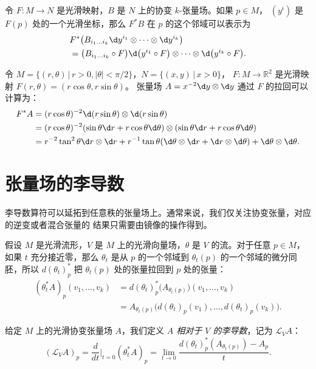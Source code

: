 \begin{corollary}
  令 $F:M\to N$ 是光滑映射，$B$ 是 $N$ 上的协变 $k$-张量场。如果 $p\in M$，
  $(y^i)$ 是 $F(p)$ 处的一个光滑坐标，那么 $F^*B$ 在 $p$ 的这个邻域可以表示为
  \begin{align*}
    &F^*\bigl(B_{i_1\dots i_k}\d y^{i_1}\otimes\cdots\otimes \d y^{i_k}\bigr)\\
    &=\bigl(B_{i_1\dots i_k}\circ F\bigr)
    \d\bigl(y^{i_1}\circ F\bigr)\otimes\cdots\otimes
    \d\bigl(y^{i_k}\circ F\bigr).
  \end{align*}
\end{corollary}

\begin{example}
  令 $M=\{(r,\theta)\,|\, r>0,|\theta|<\pi/2\}$，$N=\{(x,y)\,|\, x>0\}$，
  $F:M\to \mathbb{R}^2$ 是光滑映射 $F(r,\theta)=(r\cos\theta,r\sin\theta)$。
  张量场 $A=x^{-2}\d y\otimes\d y$ 通过 $F$ 的拉回可以计算为：
  \begin{align*}
    F^*A&=(r\cos\theta)^{-2}\d(r\sin\theta)\otimes\d (r\sin\theta)\\
    &=(r\cos\theta)^{-2}(\sin\theta\d r+r\cos\theta\d\theta)
    \otimes (\sin\theta\d r+r\cos\theta\d\theta)\\
    &=r^{-2}\tan^2\theta\d r\otimes\d r+
    r^{-1}\tan\theta(\d\theta\otimes\d r+\d r\otimes\d \theta)
    +\d\theta\otimes\d\theta.
  \end{align*}
\end{example}

\section{张量场的李导数}

李导数算符可以延拓到任意秩的张量场上。通常来说，我们仅关注协变张量，对应的逆变或者混合张量的
结果只需要由镜像的操作得到。

假设 $M$ 是光滑流形，$V$ 是 $M$ 上的光滑向量场，$\theta$ 是 $V$ 的流。对于任意 $p\in M$，如果
$t$ 充分接近零，那么 $\theta_t$ 是从 $p$ 的一个邻域到 $\theta_t(p)$ 的一个邻域的微分同胚，所以
$d(\theta_t)_p^*$ 把 $\theta_t(p)$ 处的张量拉回到 $p$ 处的张量：
\begin{align*}
  (\theta_t^*A)_p(v_1,\dots,v_k)&=  d(\theta_t)_p^*\bigl(A_{\theta_t(p)}\bigr)(v_1,\dots,v_k)\\
  &=A_{\theta_t(p)}\bigl(
    d(\theta_t)_p(v_1),\dots,d(\theta_t)_p(v_k)
  \bigr).
\end{align*}

给定 $M$ 上的光滑协变张量场 $A$，我们定义 \emph{$A$ 相对于 $V$ 的李导数}，记为 $\mathcal L_VA$：
\begin{equation}
  (\mathcal L_VA)_p=\frac{d}{dt}\bigg|_{t=0}(\theta_t^*A)_p=\lim_{t\to 0}
  \frac{d(\theta_t)_p^*(A_{\theta_t(p)})-A_p}{t}.
\end{equation}




